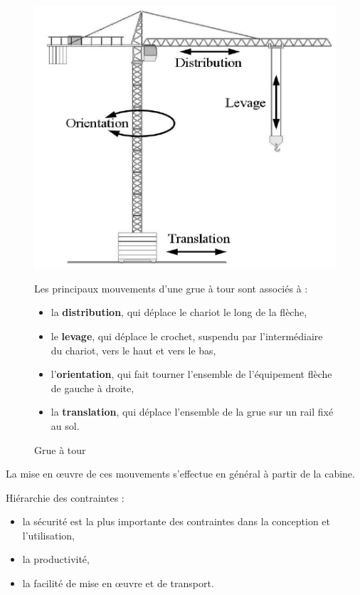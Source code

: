 \begin{figure}[!h]
 \begin{minipage}{0.40\linewidth}
  \centering\includegraphics[width=0.9\linewidth]{img/grue1.png}
  \caption{Grue à tour}
  \label{img:grue1}
 \end{minipage}
\hfill
 \begin{minipage}{0.55\linewidth}
 Les principaux mouvements d'une grue à tour sont associés à :
\begin{itemize}
 \item la \textbf{distribution}, qui déplace le chariot le long de la flèche,
 \item le \textbf{levage}, qui déplace le crochet, suspendu par l'intermédiaire du chariot, vers le haut et vers le bas,
 \item l'\textbf{orientation}, qui fait tourner l'ensemble de l'équipement flèche de gauche à droite,
 \item la \textbf{translation}, qui déplace l'ensemble de la grue sur un rail fixé au sol.
\end{itemize}
 \end{minipage}
\end{figure}

La mise en \oe uvre de ces mouvements s'effectue en général à partir de la cabine.

Hiérarchie des contraintes :
\begin{itemize}
 \item la sécurité est la plus importante des contraintes dans la conception et l'utilisation,
 \item la productivité,
 \item la facilité de mise en \oe uvre et de transport.
\end{itemize}


